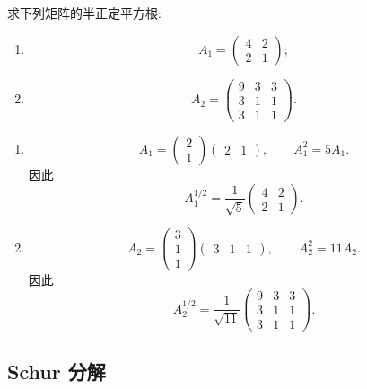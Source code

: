 \begin{example}
求下列矩阵的半正定平方根:
\begin{enumerate}
    \item
    \[
    A_1=
    \begin{pmatrix}
    4&2\\
    2&1
    \end{pmatrix};
    \]
    \item
    \[
    A_2=
    \begin{pmatrix}
    9&3&3\\
    3&1&1\\
    3&1&1
    \end{pmatrix}.
    \]
\end{enumerate}
\end{example}
\exampleblank

\begin{solution}
\leavevmode
\begin{enumerate}
    \item
    \[
    A_1=
    \begin{pmatrix}2\\1\end{pmatrix}
    \begin{pmatrix}2&1\end{pmatrix},
    \qquad
    A_1^2=5A_1.
    \]
    因此
    \[
    \boxed{
    A_1^{1/2}
    =
    \dfrac1{\sqrt5}
    \begin{pmatrix}
    4&2\\
    2&1
    \end{pmatrix}.
    }
    \]

    \item
    \[
    A_2=
    \begin{pmatrix}3\\1\\1\end{pmatrix}
    \begin{pmatrix}3&1&1\end{pmatrix},
    \qquad
    A_2^2=11A_2.
    \]
    因此
    \[
    \boxed{
    A_2^{1/2}
    =
    \dfrac1{\sqrt{11}}
    \begin{pmatrix}
    9&3&3\\
    3&1&1\\
    3&1&1
    \end{pmatrix}.
    }
    \]
\end{enumerate}
\end{solution}


\subsection{Schur 分解}

